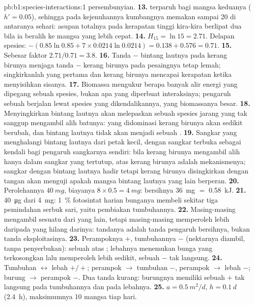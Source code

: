 \begin{solution}{pb:b1:species-interactions:1}
persembunyian.
\textbf{13.}  terparuh bagi mangsa keduanya ($h' = 0.05$),
sehingga pada kejenuhannya kumbangnya memakan sampai 20 di antaranya
sehari: asupan totalnya pada kerapatan tinggi kira-kira berlipat dua
bila ia beralih ke mangsa yang lebih cepat.
\textbf{14.} $H_{15} = \ln 15 = 2.71$. Delapan spesies: $-(0.85\ln 0.85
+ 7\times 0.0214\ln 0.0214) = 0.138 + 0.576 = 0.71$.
\textbf{15.} Sebesar faktor $2.71/0.71 = 3.8$.
\textbf{16.} Tanda $-$ bintang lautnya pada kerang birunya menjaga
tanda $-$ kerang birunya pada pesaingnya tetap lemah; singkirkanlah
yang pertama dan kerang birunya mencapai kerapatan ketika
 menyisihkan sisanya.
\textbf{17.} Biomassa mengukur berapa banyak alir energi yang dipegang
sebuah spesies, bukan apa yang diperbuat interaksinya; pengaruh sebuah
 berjalan lewat spesies yang dikendalikannya, yang
biomassanya besar.
\textbf{18.} Menyingkirkan bintang lautnya akan melepaskan sebuah
spesies jarang yang tak sanggup mengambil alih batunya:  yang
didominasi kerang birunya akan sedikit berubah, dan bintang lautnya
tidak akan menjadi sebuah .
\textbf{19.} Sangkar yang menghalangi bintang lautnya dari petak
kecil, dengan sangkar terbuka sebagai kendali bagi pengaruh sangkarnya
sendiri: bila kerang birunya mengambil alih hanya dalam sangkar yang
tertutup,  atas kerang birunya adalah mekanismenya; sangkar
dengan bintang lautnya hadir tetapi kerang birunya disingkirkan dengan
tangan akan menguji apakah mangsa bintang lautnya yang lain berperan.
\textbf{20.} Perolehannya $\qty{40}{mg}$, biayanya $8\times 0.5 = \qty{4}{mg}$: bersihnya
\qty{36}{mg} $=$ \qty{0.58}{kJ}.
\textbf{21.} \qty{40}{\micro g} dari \qty{4}{mg}: \qty{1}{\%}
fotosintat harian bunganya membeli sekitar tiga pemindahan serbuk
sari, yaitu pembiakan tumbuhannya.
\textbf{22.} Masing-masing mengambil sesuatu dari yang lain, tetapi
masing-masing memperoleh lebih daripada yang hilang darinya: tandanya
adalah tanda pengaruh bersihnya, bukan tanda eksploitasinya.
\textbf{23.} Perampoknya $+$, tumbuhannya $-$ (nektarnya diambil, tanpa
penyerbukan): sebuah  atas ; lebahnya menemukan
bunga yang terkosongkan lalu memperoleh lebih sedikit, sebuah $-$ tak
langsung.
\textbf{24.} Tumbuhan $\leftrightarrow$ lebah $+/+$; perampok $\to$ tumbuhan $-$,
perampok $\to$ lebah $-$; burung $\to$ perampok $-$. Dua tanda kurang:
burungnya memiliki sebuah $+$ tak langsung pada tumbuhannya dan pada
lebahnya.
\textbf{25.} $a = \qty{0.5}{m^2/d}$, $h = \qty{0.1}{d}$ (\qty{2.4}{h}),
maksimumnya \num{10} mangsa tiap hari.
\end{solution}

